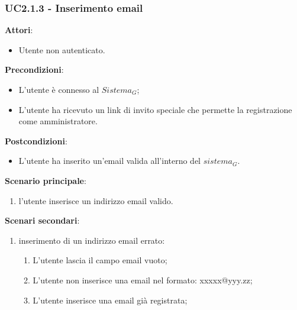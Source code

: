 \subsubsection{UC2.1.3 - Inserimento email}\label{usecase:2_1_3}
\textbf{Attori}:
\begin{itemize}
    \item Utente non autenticato.
\end{itemize}
\textbf{Precondizioni}:
\begin{itemize}
    \item L'utente è connesso al $\textit{Sistema}_G$;
    \item L'utente ha ricevuto un link di invito speciale che permette la registrazione come amministratore.
\end{itemize}
\textbf{Postcondizioni}:
\begin{itemize}
    \item L'utente ha inserito un'email valida all'interno del $\textit{sistema}_G$.
\end{itemize}
\textbf{Scenario principale}:
\begin{enumerate}
    \item l'utente inserisce un indirizzo email valido.
\end{enumerate}
\textbf{Scenari secondari}:

\begin{enumerate}
    \item inserimento di un indirizzo email errato:
    \begin{enumerate}
            \item L'utente lascia il campo email vuoto;
            \item L'utente non inserisce una email nel formato: xxxxx@yyy.zz;
            \item L'utente inserisce una email già registrata;
        \end{enumerate} 
\end{enumerate}

